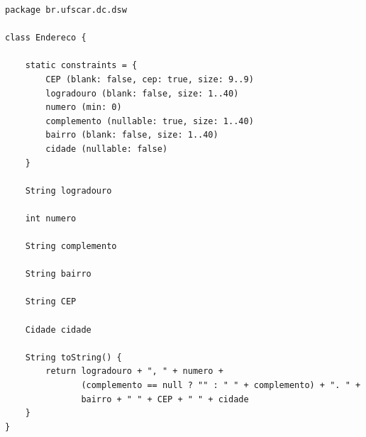 \begin{lstlisting}[caption=Classe  de  domínio  {\bf  Endereco}, frame  =  trBL,
    float=htbp, label=codEndereco]
package br.ufscar.dc.dsw

class Endereco {

    static constraints = {
        CEP (blank: false, cep: true, size: 9..9)
        logradouro (blank: false, size: 1..40)
        numero (min: 0)
        complemento (nullable: true, size: 1..40)
        bairro (blank: false, size: 1..40)
        cidade (nullable: false)
    }
    
    String logradouro
    
    int numero
    
    String complemento
    
    String bairro
    
    String CEP
    
    Cidade cidade
    
    String toString() {
        return logradouro + ", " + numero + 
               (complemento == null ? "" : " " + complemento) + ". " + 
               bairro + " " + CEP + " " + cidade 
    }
} 
\end{lstlisting}

\hspace{1cm}\\
\hspace{1cm}\\

